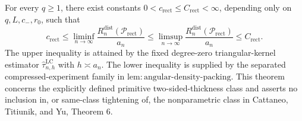 For every \(q\geq1\), there exist constants \(0<c_{\mathrm{rect}}\leq C_{\mathrm{rect}}<\infty\), depending only on \(q,L,c_{-},r_0\), such that \[c_{\mathrm{rect}}\leq\liminf_{n\to\infty}\frac{R_n^{\mathrm{dist}}(\mathcal{P}_{\mathrm{rect}})}{a_n}\leq\limsup_{n\to\infty}\frac{R_n^{\mathrm{dist}}(\mathcal{P}_{\mathrm{rect}})}{a_n}\leq C_{\mathrm{rect}}.\] The upper inequality is attained by the fixed degree-zero triangular-kernel estimator \(\widehat{\tau}^{\mathrm{LC}}_{n,h}\) with \(h\asymp a_n\). The lower inequality is supplied by the separated compressed-experiment family in \(\mathrm{lem:angular\text{-}density\text{-}packing}\). This theorem concerns the explicitly defined primitive two-sided-thickness class and asserts no inclusion in, or same-class tightening of, the nonparametric class in Cattaneo, Titiunik, and Yu, Theorem 6.